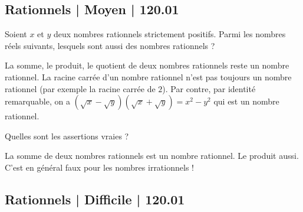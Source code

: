 \subsection{Rationnels | Moyen | 120.01}

\begin{question}
Soient $x$ et $y$ deux nombres rationnels strictement positifs.
Parmi les nombres réels suivants, lesquels sont aussi des nombres rationnels ?
\begin{answers}



   
\end{answers}
\begin{explanations}
La somme, le produit, le quotient de deux nombres rationnels reste un nombre rationnel. La racine carrée d'un nombre rationnel n'est pas toujours un nombre rationnel (par exemple la racine carrée de $2$). Par contre, par identité remarquable, on a $(\sqrt{x}-\sqrt{y})(\sqrt{x}+\sqrt{y}) = x^2-y^2$ qui est un nombre rationnel.
\end{explanations}
\end{question}


\begin{question}
Quelles sont les assertions vraies ?
\begin{answers}



\end{answers}
\begin{explanations}
La somme de deux nombres rationnels est un nombre rationnel. Le produit aussi.
C'est en général faux pour les nombres irrationnels !
\end{explanations}
\end{question}



\subsection{Rationnels | Difficile | 120.01}

